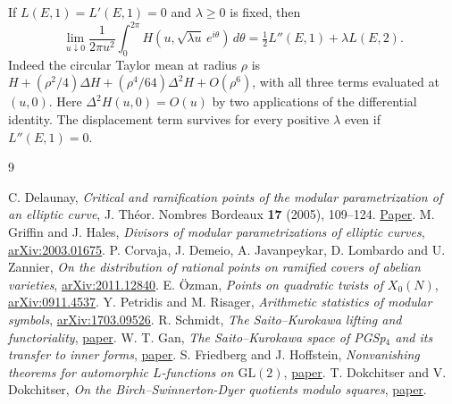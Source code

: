 \documentclass[11pt]{article}
\begin{document}
If $L(E,1)=L'(E,1)=0$ and $\lambda\ge0$ is fixed, then
\[
 \lim_{u\downarrow0}\frac1{2\pi u^2}\int_0^{2\pi}
       H\!\left(u,\sqrt{\lambda u}\,e^{i\theta}\right)\,d\theta
 =\tfrac12 L''(E,1)+\lambda L(E,2).
\]
Indeed the circular Taylor mean at radius $\rho$ is
$H+(\rho^2/4)\Delta H+(\rho^4/64)\Delta^2 H+O(\rho^6)$, with all
three terms evaluated at $(u,0)$. Here $\Delta^2H(u,0)=O(u)$ by
two applications of the differential identity. The displacement
term survives for every positive $\lambda$ even if $L''(E,1)=0$.


\begin{thebibliography}{9}\raggedright
{} C. Delaunay, \emph{Critical and ramification points of the modular
parametrization of an elliptic curve}, J. Th\'eor. Nombres Bordeaux
\textbf{17} (2005), 109--124. \href{https://doi.org/10.5802/jtnb.480}{Paper}.
 M. Griffin and J. Hales, \emph{Divisors of modular parametrizations
of elliptic curves}, \href{https://arxiv.org/abs/2003.01675}{arXiv:2003.01675}.
 P. Corvaja, J. Demeio, A. Javanpeykar, D. Lombardo and
U. Zannier, \emph{On the distribution of rational points on ramified covers
of abelian varieties}, \href{https://arxiv.org/abs/2011.12840}{arXiv:2011.12840}.
 E. \"Ozman, \emph{Points on quadratic twists of $X_0(N)$},
\href{https://arxiv.org/abs/0911.4537}{arXiv:0911.4537}.
 Y. Petridis and M. Risager, \emph{Arithmetic statistics of
modular symbols}, \href{https://arxiv.org/abs/1703.09526}{arXiv:1703.09526}.
 R. Schmidt, \emph{The Saito--Kurokawa lifting and functoriality},
\href{https://www.math.uni-sb.de/ag/schulze/rschmidt/papers/skfunc.pdf}{paper}.
 W. T. Gan, \emph{The Saito--Kurokawa space of PGSp$_4$ and its transfer to inner forms},
\href{https://math.nyu.edu/~tschinke/princeton/papers/.aim05/submitted/gan.pdf}{paper}.
 S. Friedberg and J. Hoffstein, \emph{Nonvanishing theorems
for automorphic $L$-functions on $\mathrm{GL}(2)$},
\href{https://annals.math.princeton.edu/1995/142-2/p04}{paper}.
 T. Dokchitser and V. Dokchitser,
\emph{On the Birch--Swinnerton-Dyer quotients modulo squares},
\href{https://annals.math.princeton.edu/wp-content/uploads/annals-v172-n1-p11-p.pdf}{paper}.
\end{thebibliography}
\end{document}
